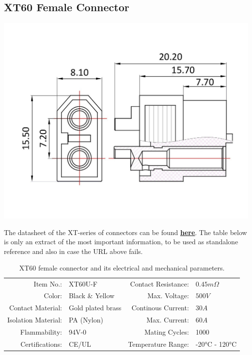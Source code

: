 \clearpage %

\subsection{XT60 Female Connector}

\includegraphics[width=\textwidth]{contents/figures/xt60_f.jpg}

The datasheet of the XT-series of connectors can be found \href{https://www.lcsc.com/datasheet/lcsc_datasheet_2401031338_Changzhou-Amass-Elec-XT60U-F_C19191801.pdf}{\textbf{\underline{here}}}.
The table below is only an extract of the most important information, to be used as standalone reference and also in case the URL above fails.

\begin{table}[h] %
    \begin{tabular}{rlrl}
         Item No.:&  XT60U-F &  Contact Resistance:& $0.45m \Omega$\\
         Color:&  Black \& Yellow&  Max. Voltage:& $500V$\\
         Contact Material:&  Gold plated brass&  Continous Current:& $30A$\\
         Isolation Material:&  PA (Nylon)&  Max. Current:& $60A$\\
         Flammability:&  94V-0&  Mating Cycles:& 1000\\
         Certifications:&  CE/UL&  Temperature Range:& -20°C - 120°C\\
    \end{tabular}
    \caption{XT60 female connector and its electrical and mechanical parameters.}
    \label{xt60_f_specs}
\end{table}

